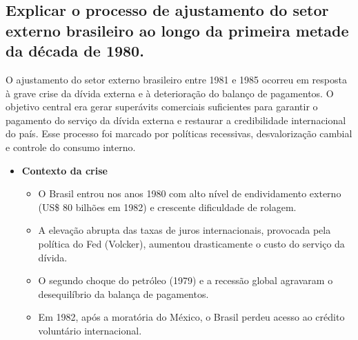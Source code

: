\documentclass{sciposter}
\begin{document}
\begin{multicols}{3}
\section{\textbf{Explicar o processo de ajustamento do setor externo brasileiro ao longo da primeira metade da década de 1980.}}

O ajustamento do setor externo brasileiro entre 1981 e 1985 ocorreu em resposta à grave crise da dívida externa e à deterioração do balanço de pagamentos. O objetivo central era gerar superávits comerciais suficientes para garantir o pagamento do serviço da dívida externa e restaurar a credibilidade internacional do país. Esse processo foi marcado por políticas recessivas, desvalorização cambial e controle do consumo interno.

\begin{itemize}
    \item \textbf{ Contexto da crise}
    \begin{itemize}
        \item O Brasil entrou nos anos 1980 com alto nível de endividamento externo (US\$ 80 bilhões em 1982) e crescente dificuldade de rolagem.
        \item A elevação abrupta das taxas de juros internacionais, provocada pela política do Fed (Volcker), aumentou drasticamente o custo do serviço da dívida.
        \item O segundo choque do petróleo (1979) e a recessão global agravaram o desequilíbrio da balança de pagamentos.
        \item Em 1982, após a moratória do México, o Brasil perdeu acesso ao crédito voluntário internacional.
    \end{itemize}


\end{itemize}
\end{multicols}
\end{document}
